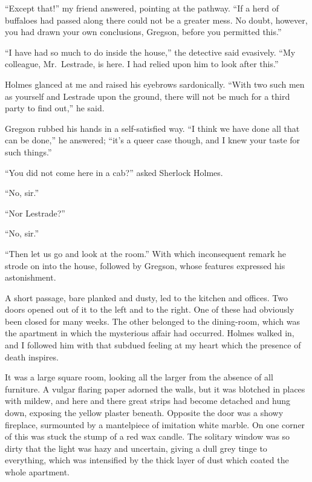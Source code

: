 \documentclass[12pt,english]{book}
\begin{document}
{}``Except that!'' my friend answered, pointing at the pathway.
{}``If a herd of buffaloes had passed along there could not be a
greater mess. No doubt, however, you had drawn your own conclusions,
Gregson, before you permitted this.''

{}``I have had so much to do inside the house,'' the detective said
evasively. {}``My colleague, Mr.\ Lestrade, is here. I had relied
upon him to look after this.''

Holmes glanced at me and raised his eyebrows sardonically. {}``With
two such men as yourself and Lestrade upon the ground, there will
not be much for a third party to find out,'' he said.

Gregson rubbed his hands in a self-satisfied way. {}``I think we
have done all that can be done,'' he answered; {}``it's a queer
case though, and I knew your taste for such things.''

{}``You did not come here in a cab?'' asked Sherlock Holmes.

{}``No, sir.''

{}``Nor Lestrade?''

{}``No, sir.''

{}``Then let us go and look at the room.'' With which inconsequent
remark he strode on into the house, followed by Gregson, whose features
expressed his astonishment.

A short passage, bare planked and dusty, led to the kitchen and offices.
Two doors opened out of it to the left and to the right. One of these
had obviously been closed for many weeks. The other belonged to the
dining-room, which was the apartment in which the mysterious affair
had occurred. Holmes walked in, and I followed him with that subdued
feeling at my heart which the presence of death inspires.

It was a large square room, looking all the larger from the absence
of all furniture. A vulgar flaring paper adorned the walls, but it
was blotched in places with mildew, and here and there great strips
had become detached and hung down, exposing the yellow plaster beneath.
Opposite the door was a showy fireplace, surmounted by a mantelpiece
of imitation white marble. On one corner of this was stuck the stump
of a red wax candle. The solitary window was so dirty that the light
was hazy and uncertain, giving a dull grey tinge to everything, which
was intensified by the thick layer of dust which coated the whole
apartment.
\end{document}

